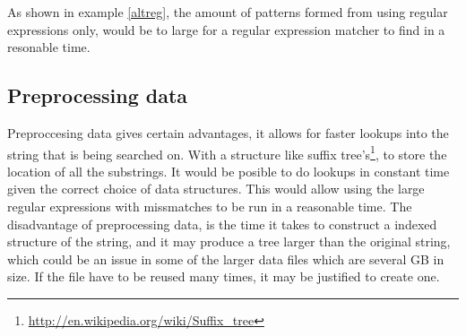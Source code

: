 As shown in example \ref{altreg}, the amount of patterns formed from using regular expressions only, would be to large for a regular expression matcher to find in a resonable time. 

\subsection{Preprocessing data}
Preproccesing data gives certain advantages, it allows for faster lookups into the string that is being searched on. With a structure like suffix tree's\footnote{\url{http://en.wikipedia.org/wiki/Suffix_tree}}, to store the location of all the substrings. It would be posible to do lookups in constant time given the correct choice of data structures. This would allow using the large regular expressions with missmatches to be run in a reasonable time.
The disadvantage of preprocessing data, is the time it takes to construct a indexed structure of the string, and it may produce a tree larger than the original string, which could be an issue in some of the larger data files which are several GB in size. If the file have to be reused many times, it may be justified to create one. 